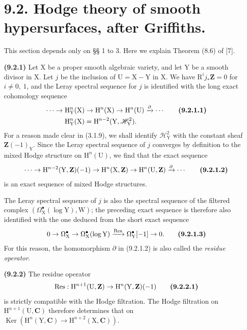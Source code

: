 \documentclass[11pt,leqno]{article}
\begin{document}
\section*{9.2. Hodge theory of smooth hypersurfaces, after Griffiths.}

This section depends only on §§ 1 to 3. Here we explain Theorem (8.6) of [7].

\textbf{(9.2.1)} Let \(\mathrm{X}\) be a proper smooth algebraic variety, and let \(\mathrm{Y}\) be a smooth divisor in \(\mathrm{X}\). Let \(j\) be the inclusion of \(\mathrm{U}=\mathrm{X}-\mathrm{Y}\) in \(\mathrm{X}\). We have \(\mathrm{R}^{i}j_{*}\mathbf{Z}=0\) for \(i\neq0,\ 1\), and the Leray spectral sequence for \(j\) is identified with the long exact cohomology sequence
\begin{align*}
\cdots\to\mathrm{H}_{\mathrm{Y}}^{n}(\mathrm{X})
&\to\mathrm{H}^{n}(\mathrm{X})
\to\mathrm{H}^{n}(\mathrm{U})
\xrightarrow{\partial}\cdots
\tag*{\textbf{(9.2.1.1)}}\\
\mathrm{H}_{\mathrm{Y}}^{n}(\mathrm{X})
&=\mathrm{H}^{n-2}(\mathrm{Y},\mathscr{H}_{\mathrm{Y}}^{2}).
\end{align*}
For a reason made clear in (3.1.9), we shall identify \(\mathscr{H}_{\mathrm{Y}}^{2}\) with the constant sheaf  \(\mathbf{Z}(-1)_{\mathrm{Y}}\). Since the Leray spectral sequence of \(j\) converges by definition to the mixed Hodge structure on \(\mathrm{H}^{n}(\mathrm{U})\), we find that the exact sequence
\[
\cdots\to
\mathrm{H}^{n-2}(\mathrm{Y},\mathbf{Z})(-1)
\to\mathrm{H}^{n}(\mathrm{X},\mathbf{Z})
\to\mathrm{H}^{n}(\mathrm{U},\mathbf{Z})
\xrightarrow{\partial}\cdots
\tag*{\textbf{(9.2.1.2)}}
\]
is an exact sequence of mixed Hodge structures.

The Leray spectral sequence of \(j\) is also the spectral sequence of the filtered complex \((\Omega_{\mathrm{X}}^{\bullet}(\log\mathrm{Y}),\mathrm{W})\); the preceding exact sequence is therefore also identified with the one deduced from the short exact sequence
\[
0\to\Omega_{\mathrm{X}}^{\bullet}
\to\Omega_{\mathrm{X}}^{\bullet}(\log\mathrm{Y})
\xrightarrow{\operatorname{Res}}
\Omega_{\mathrm{Y}}^{\bullet}[-1]\to0.
\tag*{\textbf{(9.2.1.3)}}
\]
For this reason, the homomorphism \(\partial\) in (9.2.1.2) is also called the \textit{residue operator}.

\textbf{(9.2.2)} The residue operator
\[
\operatorname{Res}:\mathrm{H}^{n+1}(\mathrm{U},\mathbf{Z})
\to\mathrm{H}^{n}(\mathrm{Y},\mathbf{Z})(-1)
\tag*{\textbf{(9.2.2.1)}}
\]
is strictly compatible with the Hodge filtration. The Hodge filtration on \(\mathrm{H}^{n+1}(\mathrm{U},\mathbf{C})\) therefore determines that on \(\operatorname{Ker}(\mathrm{H}^{n}(\mathrm{Y},\mathbf{C})\to\mathrm{H}^{n+2}(\mathrm{X},\mathbf{C}))\).
\end{document}
